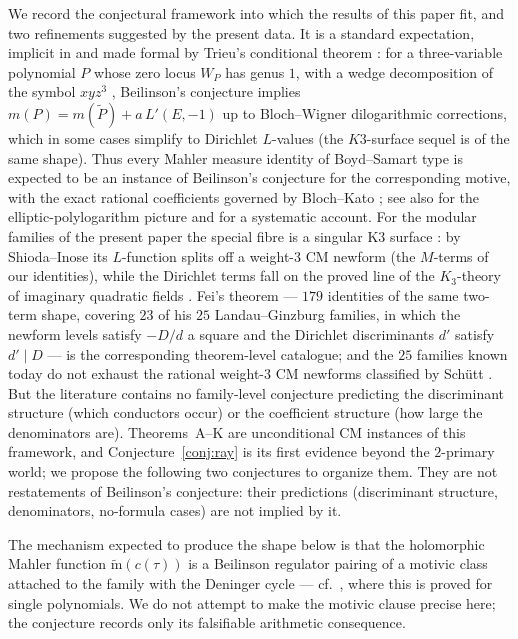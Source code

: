 \documentclass[11pt]{article}
\newcommand{\mt}{\widetilde{\mathrm{m}}}    %
\theoremstyle{definition}
\theoremstyle{remark}
\begin{document}
We record the conjectural framework into which the results of this
paper fit, and two refinements suggested by the present data. It is
a standard expectation, implicit in \cite{De} and made formal by
Trieu's conditional theorem \cite[Thm.~0.2]{Tr1}: for a
three-variable polynomial $P$ whose zero locus $W_P$ has genus $1$,
with a wedge decomposition of the symbol $xyz^3$
\cite[(0.8)]{Tr1}, Beilinson's conjecture \cite{Bei} implies
$m(P)=m(\widetilde P)+a\,L'(E,-1)$ up to Bloch--Wigner
dilogarithmic corrections, which in some cases simplify to Dirichlet
$L$-values (the $K3$-surface sequel \cite{Tr2} is of the same
shape). Thus every Mahler measure identity of Boyd--Samart type is
expected to be an instance of
Beilinson's conjecture for the corresponding motive, with the exact
rational coefficients governed by Bloch--Kato \cite{BK}; see also
\cite{ZaG} for the elliptic-polylogarithm picture and \cite{BZ} for
a systematic account. For the modular families of the present paper
the special fibre is a singular K3 surface \cite{BerK3}: by
Shioda--Inose \cite{SI} its $L$-function splits off a weight-$3$ CM
newform (the $M$-terms of our identities), while the Dirichlet terms
fall on the proved line of the $K_3$-theory of imaginary quadratic
fields \cite{Za}. Fei's theorem \cite[Thm.~0.2]{Fei} --- $179$
identities of the same two-term shape, covering $23$ of his $25$
Landau--Ginzburg families, in which the newform levels satisfy
$-D/d$ a square and the Dirichlet discriminants $d'$ satisfy
$d'\mid D$ --- is the corresponding theorem-level catalogue; and the
$25$ families known today do not exhaust the rational weight-$3$ CM
newforms classified by Sch\"utt \cite{Sch}. But the literature
contains no family-level conjecture predicting the discriminant
structure (which conductors occur) or the coefficient structure (how
large the denominators are). Theorems~A--K are unconditional CM
instances of this framework, and Conjecture~\ref{conj:ray} is its
first evidence beyond the $2$-primary world; we propose the
following two conjectures to organize them. They are not
restatements of Beilinson's conjecture: their predictions
(discriminant structure, denominators, no-formula cases) are not
implied by it.

The mechanism expected to produce the shape below is that the
holomorphic Mahler function $\mt(c(\tau))$ is a Beilinson regulator
pairing of a motivic class attached to the family with the Deninger
cycle --- cf.\ \cite{Tr1}, where this is proved for single
polynomials. We do not attempt to make the motivic clause precise
here; the conjecture records only its falsifiable arithmetic
consequence.
\end{document}
